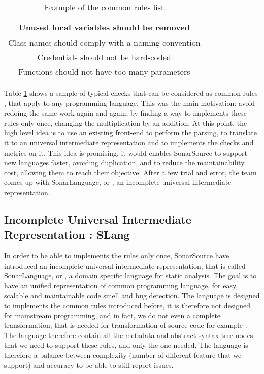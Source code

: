 \begin{table}[h]
\centering
\caption{Example of the common rules list}
\label{table:common_rules}
	\begin{tabular}{|c|}
		\hline
		Unused local variables should be removed  \\ \hline
		Class names should comply with a naming convention \\ \hline
		Credentials should not be hard-coded \\ \hline
		Functions should not have too many parameters \\ \hline
	\end{tabular}
\end{table}

Table \ref{table:common_rules} shows a sample of typical checks that can be considered as common rules \cite{JiraSonarSource:2019:Online} , that apply to any programming language.
This was the main motivation: avoid redoing the same work again and again, by finding a way to implements these rules only once, changing the multiplication by an addition.
At this point, the high level idea is to use an existing front-end to perform the parsing, to translate it to an universal intermediate representation and to implements the checks and metrics on it.
This idea is promising, it would enables SonarSource to support new languages faster, avoiding duplication, and to reduce the maintainability cost, allowing them to reach their objective.
After a few trial and error, the team comes up with SonarLanguage, or \slang, an incomplete universal intermediate representation. 


\subsection{Incomplete Universal Intermediate Representation : SLang}
\label{subsec:slang}

In order to be able to implements the rules only once, SonarSource have introduced an incomplete universal intermediate representation, that is called SonarLanguage, or \slang, a domain specific language for static analysis. 
The goal is to have an unified representation of common programming language, for easy, scalable and maintainable code smell and bug detection. 
The language is designed to implements the common rules introduced before, it is therefore not designed for mainstream programming, and in fact, we do not even a complete transformation, that is needed for transformation of source code for example \cite{Koppel:2018:OTM:3288538.3276492}.
The language therefore contain all the metadata and abstract syntax tree nodes that we need to support these rules, and only the one needed.
The language is therefore a balance between complexity (number of different feature that we support) and accuracy to be able to still report issues. 

